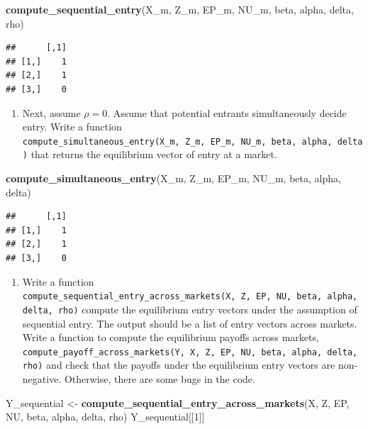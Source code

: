 \documentclass[]{book}
\newenvironment{Shaded}{\begin{snugshade}}{\end{snugshade}}
\newcommand{\KeywordTok}[1]{\textcolor[rgb]{0.13,0.29,0.53}{\textbf{#1}}}
\newcommand{\DecValTok}[1]{\textcolor[rgb]{0.00,0.00,0.81}{#1}}
\newcommand{\StringTok}[1]{\textcolor[rgb]{0.31,0.60,0.02}{#1}}
\newcommand{\NormalTok}[1]{#1}
\providecommand{\tightlist}{%
  \setlength{\itemsep}{0pt}\setlength{\parskip}{0pt}}
\begin{document}
\begin{Shaded}
\begin{Highlighting}[]
\KeywordTok{compute_sequential_entry}\NormalTok{(X_m, Z_m, EP_m, NU_m, beta, alpha, delta, rho)}
\end{Highlighting}
\end{Shaded}

\begin{verbatim}
##      [,1]
## [1,]    1
## [2,]    1
## [3,]    0
\end{verbatim}

\begin{enumerate}
\def\labelenumi{\arabic{enumi}.}
\setcounter{enumi}{5}
\tightlist
\item
  Next, assume \(\rho = 0\). Assume that potential entrants
  simultaneously decide entry. Write a function
  \texttt{compute\_simultaneous\_entry(X\_m,\ Z\_m,\ EP\_m,\ NU\_m,\ beta,\ alpha,\ delta)}
  that returns the equilibrium vector of entry at a market.
\end{enumerate}

\begin{Shaded}
\begin{Highlighting}[]
\KeywordTok{compute_simultaneous_entry}\NormalTok{(X_m, Z_m, EP_m, NU_m, beta, alpha, delta)}
\end{Highlighting}
\end{Shaded}

\begin{verbatim}
##      [,1]
## [1,]    1
## [2,]    1
## [3,]    0
\end{verbatim}

\begin{enumerate}
\def\labelenumi{\arabic{enumi}.}
\setcounter{enumi}{6}
\tightlist
\item
  Write a function
  \texttt{compute\_sequential\_entry\_across\_markets(X,\ Z,\ EP,\ NU,\ beta,\ alpha,\ delta,\ rho)}
  compute the equilibrium entry vectors under the assumption of
  sequential entry. The output should be a list of entry vectors across
  markets. Write a function to compute the equilibrium payoffs across
  markets,
  \texttt{compute\_payoff\_across\_markets(Y,\ X,\ Z,\ EP,\ NU,\ beta,\ alpha,\ delta,\ rho)}
  and check that the payoffs under the equilibrium entry vectors are
  non-negative. Otherwise, there are some bugs in the code.
\end{enumerate}

\begin{Shaded}
\begin{Highlighting}[]
\NormalTok{Y_sequential <-}
\StringTok{  }\KeywordTok{compute_sequential_entry_across_markets}\NormalTok{(X, Z, EP, NU, beta, alpha, delta, rho)}
\NormalTok{Y_sequential[[}\DecValTok{1}\NormalTok{]]}
\end{Highlighting}
\end{Shaded}
\end{document}
